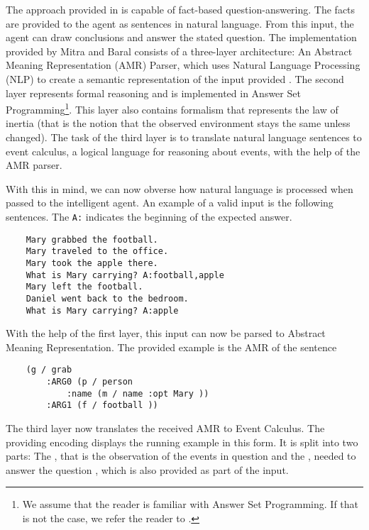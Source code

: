 \documentclass[runningheads]{llncs}
\newcommand{\authorquote}{Mitra and Baral}
\begin{document}
The approach provided in \cite{mitra2016addressing} is capable of fact-based question-answering. The facts are provided to the agent as sentences in natural language. From this input, the agent can draw conclusions and answer the stated question. The implementation provided by \authorquote{} consists of a three-layer architecture: An Abstract Meaning Representation (AMR) Parser, which uses Natural Language Processing (NLP) to create a semantic representation of the input provided \cite{banarescu2013abstract}. The second layer represents formal reasoning and is implemented in Answer Set Programming\footnote{We assume that the reader is familiar with Answer Set Programming. If that is not the case, we refer the reader to \cite{erdem2016applications}.}. This layer also contains formalism that represents the law of inertia (that is the notion that the observed environment stays the same unless changed). The task of the third layer is to translate natural language sentences to event calculus, a logical language for reasoning about events, with the help of the AMR parser.


With this in mind, we can now obverse how natural language is processed when passed to the intelligent agent. An example of a valid input is the following sentences. The \verb|A:| indicates the beginning of the expected answer.


\begin{verbatim}
    Mary grabbed the football.
    Mary traveled to the office.
    Mary took the apple there.
    What is Mary carrying? A:football,apple
    Mary left the football.
    Daniel went back to the bedroom.
    What is Mary carrying? A:apple
\end{verbatim}

With the help of the first layer, this input can now be parsed to Abstract Meaning Representation. The provided example is the AMR of the sentence 
   
\begin{verbatim}
    (g / grab
        :ARG0 (p / person
            :name (m / name :opt Mary ))
        :ARG1 (f / football ))
\end{verbatim}

The third layer now translates the received AMR to Event Calculus. The providing encoding displays the running example in this form. It is split into two parts: The , that is the observation of the events in question and the , needed to answer the question , which is also provided as part of the input. 
\end{document}
